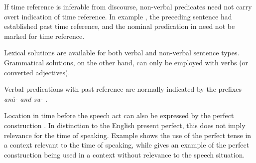 If time reference is inferable from discourse, non-verbal predicates need not carry overt indication of time reference. In example , the  preceding sentence  had established past time reference, and the nominal predication in  need not be marked for time reference.



Lexical solutions are available for both verbal and non-verbal sentence types. Grammatical solutions, on the other hand, can only be employed with verbs (or converted adjectives).


Verbal predications with past reference are normally indicated by the prefixes \em anà- \em {} and \em su- \em {}.




Location in time before the speech act can also be expressed by  the  perfect construction . In distinction to the English present perfect, this does not imply relevance for the time of speaking. Example  shows the use of the perfect tense in a context relevant to the time of speaking, while   gives an example of the perfect construction being used in a context without relevance to the speech situation.



